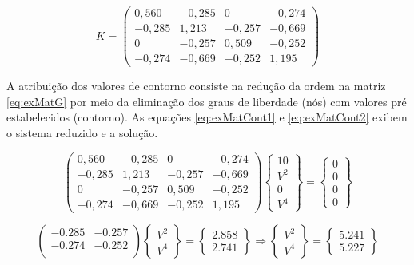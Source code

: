 \documentclass[
    12pt,               %
    openright,          %
    oneside,
    a4paper,            %
    english,            %
    french,             %
    spanish,            %
    brazil              %
    ]{abntex2}
\begin{document}
\begin{apendicesenv}
\begin{equation}
\label{eq:exMatG}
K = 
\begin{pmatrix}
0,560 &	-0,285 &	0&	-0,274\\
-0,285&	1,213&	-0,257&	-0,669\\
0&	-0,257&	0,509&	-0,252\\
-0,274&	-0,669&	-0,252&	1,195
\end{pmatrix}
\end{equation}

A atribuição dos valores de contorno consiste na redução da ordem na matriz \ref{eq:exMatG} por meio da eliminação dos graus de liberdade (nós) com valores pré estabelecidos (contorno). As equações \ref{eq:exMatCont1} e \ref{eq:exMatCont2} exibem o sistema reduzido e a solução.

\begin{equation}
\label{eq:exMatCont1}
\begin{pmatrix}
0,560 &	-0,285 &	0&	-0,274\\
-0,285&	1,213&	-0,257&	-0,669\\
0&	-0,257&	0,509&	-0,252\\
-0,274&	-0,669&	-0,252&	1,195
\end{pmatrix}
\begin{Bmatrix}
10 \\
V^2\\
0\\
V^4
\end{Bmatrix}
=
\begin{Bmatrix}
0\\
0\\
0\\
0
\end{Bmatrix}
\end{equation}


\begin{equation}
\label{eq:exMatCont2}
\begin{pmatrix}
-0.285  & -0.257\\
-0.274 &  -0.252\\
\end{pmatrix}
\begin{Bmatrix}
V^2\\
V^4
\end{Bmatrix}
=
\begin{Bmatrix}
 2.858\\
 2.741
\end{Bmatrix}
\Rightarrow
\begin{Bmatrix}
V^2 \\
V^4
\end{Bmatrix}
=
\begin{Bmatrix}
5.241\\
5.227
\end{Bmatrix}
\end{equation}

\end{apendicesenv}
\end{document}
